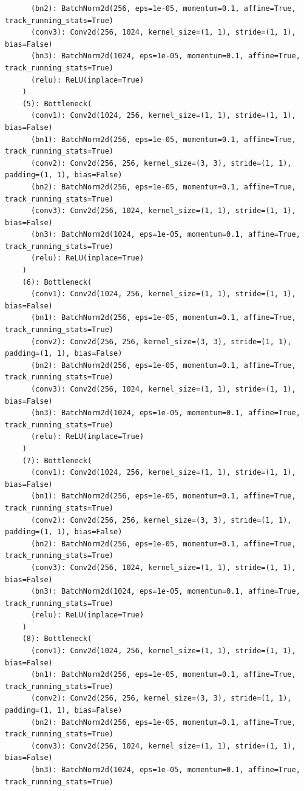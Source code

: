 \documentclass{article}
\begin{document}
\begin{verbatim}
      (bn2): BatchNorm2d(256, eps=1e-05, momentum=0.1, affine=True, track_running_stats=True)
      (conv3): Conv2d(256, 1024, kernel_size=(1, 1), stride=(1, 1), bias=False)
      (bn3): BatchNorm2d(1024, eps=1e-05, momentum=0.1, affine=True, track_running_stats=True)
      (relu): ReLU(inplace=True)
    )
    (5): Bottleneck(
      (conv1): Conv2d(1024, 256, kernel_size=(1, 1), stride=(1, 1), bias=False)
      (bn1): BatchNorm2d(256, eps=1e-05, momentum=0.1, affine=True, track_running_stats=True)
      (conv2): Conv2d(256, 256, kernel_size=(3, 3), stride=(1, 1), padding=(1, 1), bias=False)
      (bn2): BatchNorm2d(256, eps=1e-05, momentum=0.1, affine=True, track_running_stats=True)
      (conv3): Conv2d(256, 1024, kernel_size=(1, 1), stride=(1, 1), bias=False)
      (bn3): BatchNorm2d(1024, eps=1e-05, momentum=0.1, affine=True, track_running_stats=True)
      (relu): ReLU(inplace=True)
    )
    (6): Bottleneck(
      (conv1): Conv2d(1024, 256, kernel_size=(1, 1), stride=(1, 1), bias=False)
      (bn1): BatchNorm2d(256, eps=1e-05, momentum=0.1, affine=True, track_running_stats=True)
      (conv2): Conv2d(256, 256, kernel_size=(3, 3), stride=(1, 1), padding=(1, 1), bias=False)
      (bn2): BatchNorm2d(256, eps=1e-05, momentum=0.1, affine=True, track_running_stats=True)
      (conv3): Conv2d(256, 1024, kernel_size=(1, 1), stride=(1, 1), bias=False)
      (bn3): BatchNorm2d(1024, eps=1e-05, momentum=0.1, affine=True, track_running_stats=True)
      (relu): ReLU(inplace=True)
    )
    (7): Bottleneck(
      (conv1): Conv2d(1024, 256, kernel_size=(1, 1), stride=(1, 1), bias=False)
      (bn1): BatchNorm2d(256, eps=1e-05, momentum=0.1, affine=True, track_running_stats=True)
      (conv2): Conv2d(256, 256, kernel_size=(3, 3), stride=(1, 1), padding=(1, 1), bias=False)
      (bn2): BatchNorm2d(256, eps=1e-05, momentum=0.1, affine=True, track_running_stats=True)
      (conv3): Conv2d(256, 1024, kernel_size=(1, 1), stride=(1, 1), bias=False)
      (bn3): BatchNorm2d(1024, eps=1e-05, momentum=0.1, affine=True, track_running_stats=True)
      (relu): ReLU(inplace=True)
    )
    (8): Bottleneck(
      (conv1): Conv2d(1024, 256, kernel_size=(1, 1), stride=(1, 1), bias=False)
      (bn1): BatchNorm2d(256, eps=1e-05, momentum=0.1, affine=True, track_running_stats=True)
      (conv2): Conv2d(256, 256, kernel_size=(3, 3), stride=(1, 1), padding=(1, 1), bias=False)
      (bn2): BatchNorm2d(256, eps=1e-05, momentum=0.1, affine=True, track_running_stats=True)
      (conv3): Conv2d(256, 1024, kernel_size=(1, 1), stride=(1, 1), bias=False)
      (bn3): BatchNorm2d(1024, eps=1e-05, momentum=0.1, affine=True, track_running_stats=True)

\end{verbatim}
\end{document}
